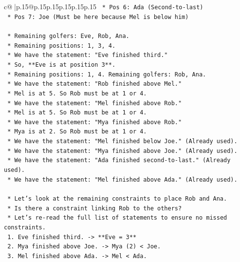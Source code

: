 \documentclass{article}
\begin{document}
{\begin{supertabular}{c@{$\;$}|p{.15\linewidth}@{}p{.15\linewidth}p{.15\linewidth}p{.15\linewidth}p{.15\linewidth}p{.15\linewidth}}
{{{\texttt{        *   Pos 6: Ada (Second{-}to{-}last)} \\
\texttt{        *   Pos 7: Joe (Must be here because Mel is below him)} \\
\\ 
\texttt{    *   Remaining golfers: Eve, Rob, Ana.} \\
\texttt{    *   Remaining positions: 1, 3, 4.} \\
\texttt{    *   We have the statement: "Eve finished third."} \\
\texttt{        *   So, **Eve is at position 3**.} \\
\texttt{    *   Remaining positions: 1, 4. Remaining golfers: Rob, Ana.} \\
\texttt{    *   We have the statement: "Rob finished above Mel."} \\
\texttt{        *   Mel is at 5. So Rob must be at 1 or 4.} \\
\texttt{    *   We have the statement: "Mel finished above Rob."} \\
\texttt{        *   Mel is at 5. So Rob must be at 1 or 4.} \\
\texttt{    *   We have the statement: "Mya finished above Rob."} \\
\texttt{        *   Mya is at 2. So Rob must be at 1 or 4.} \\
\texttt{    *   We have the statement: "Mel finished below Joe." (Already used).} \\
\texttt{    *   We have the statement: "Mya finished above Joe." (Already used).} \\
\texttt{    *   We have the statement: "Ada finished second{-}to{-}last." (Already used).} \\
\texttt{    *   We have the statement: "Mel finished above Ada." (Already used).} \\
\\ 
\texttt{    *   Let's look at the remaining constraints to place Rob and Ana.} \\
\texttt{    *   Is there a constraint linking Rob to the others?} \\
\texttt{    *   Let's re{-}read the full list of statements to ensure no missed constraints.} \\
\texttt{        1. Eve finished third. {-}> **Eve = 3**} \\
\texttt{        2. Mya finished above Joe. {-}> Mya (2) < Joe.} \\
\texttt{        3. Mel finished above Ada. {-}> Mel < Ada.} \\
}}}
\end{supertabular}}
\end{document}
